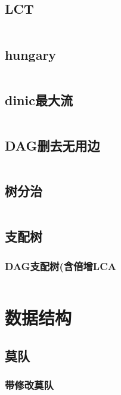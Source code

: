 \documentclass{article}
\begin{document}
\subsection{LCT} %
\inputminted[breaklines]{c++}{../图论/LCT.cpp} %

\subsection{hungary} %
\inputminted[breaklines]{c++}{../图论/hungary.cpp} %

\subsection{dinic最大流} %
\inputminted[breaklines]{c++}{../图论/dinic最大流.cpp} %

\subsection{DAG删去无用边} %
\inputminted[breaklines]{c++}{../图论/DAG删去无用边.cpp} %

\subsection{树分治} %
\inputminted[breaklines]{c++}{../图论/树分治.cpp} %

\subsection{支配树}
\subsubsection{DAG支配树(含倍增LCA}
\inputminted[breaklines]{c++}{../图论/DAG支配树.cpp}

\newpage
\section{数据结构}
\subsection{莫队}
\subsubsection{带修改莫队}
\inputminted[breaklines]{c++}{../数据结构/带修改莫队.cpp}
\end{document}
